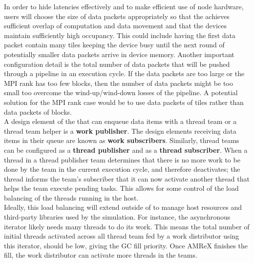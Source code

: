 \documentclass{article}
\begin{document}
In order to hide latencies effectively and to make efficient use of node
hardware, users will choose the size of data packets
appropriately so that the \OR achieves sufficient overlap of computation and
data movement and that the devices maintain
sufficiently high occupancy.  This could include having the first data
packet contain many tiles keeping the device busy until the next round
of potentially smaller data packets arrive
in device memory.  Another important configuration detail is the total
number of data packets that will be pushed through a pipeline in an execution
cycle.  If the data packets are too large or the MPI rank has too few blocks,
then the number of data packets might be too small too overcome the
wind-up/wind-down losses of the pipeline.  A potential solution for the MPI rank
case would be to use data packets of tiles rather than data packets of blocks.\\

A design element of the \OR that can enqueue data items with a thread
team or a thread team helper is a \textbf{work publisher}.  The design elements
receiving data items in their queue are known as \textbf{work
subscribers}.  Similarly, thread teams can be configured as a \textbf{thread
publisher} and as a \textbf{thread subscriber}.  When a thread in a thread
publisher team determines that there is no more work to be done by the team in the current
execution cycle, and therefore deactivates; the thread informs the team's
subscriber that it can now activate another thread that helps the team
execute pending tasks.  This allows for some control of the load balancing of the
threads running in the host.\\

Ideally, this load balancing will extend outside of \FlashOfTheFuture to manage host
resources and third-party libraries used by the simulation.
For instance, the asynchronous iterator likely needs many threads to do its
work.  This means the total number of initial threads activated across all
thread team fed by a work distributor using this iterator, should be
low, giving the GC fill priority.  Once AMReX finishes the fill, the
work distributor can activate more threads in the teams.\\
\end{document}

